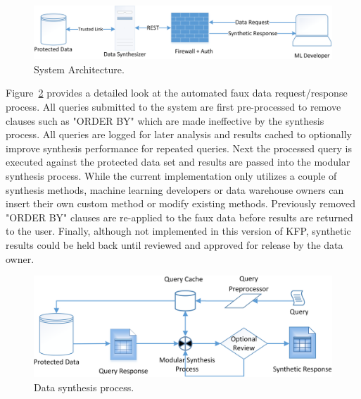 \documentclass{article}
\begin{document}
\begin{figure}[ht]
  \centering
  \includegraphics[width=\textwidth]{prototype_architecture}
  \caption{System Architecture.}
  \label{fig:architecture}
\end{figure}

Figure~\ref{fig:synthesis_process} provides a detailed look at the automated faux data request/response process. All queries submitted to the system are first pre-processed to remove clauses such as "ORDER BY" which are made ineffective by the synthesis process. All queries are logged for later analysis and results cached to optionally improve synthesis performance for repeated queries. Next the processed query is executed against the protected data set and results are passed into the modular synthesis process. While the current implementation only utilizes a couple of synthesis methods, machine learning developers or data warehouse owners can insert their own custom method or modify existing methods. Previously removed "ORDER BY" clauses are re-applied to the faux data before results are returned to the user. Finally, although not implemented in this version of KFP, synthetic results could be held back until reviewed and approved for release by the data owner.



\begin{figure}[ht]
  \centering
  \includegraphics[width=120mm]{data_synthesis_process}
  \caption{Data synthesis process.}
  \label{fig:synthesis_process}
\end{figure}
\end{document}
